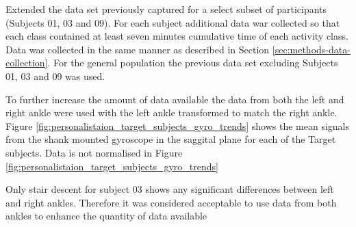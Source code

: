 Extended the data set previously captured for a select subset of participants (Subjects 01, 03 and 09). For each subject additional data war collected so that each class contained at least seven minutes cumulative time of each activity class. Data was collected in the same manner as described in Section \ref{sec:methods-data-collection}. For the general population the previous data set excluding Subjects 01, 03 and 09 was used.

To further increase the amount of data available the data from both the left and right ankle were used with the left ankle transformed to match the right ankle. Figure \ref{fig:personalistaion_target_subjects_gyro_trends} shows the mean signals from the shank mounted gyroscope in the saggital plane for each of the Target subjects. Data is not normalised in Figure \ref{fig:personalistaion_target_subjects_gyro_trends}

Only stair descent for subject 03 shows any significant differences between left and right ankles. Therefore it was considered acceptable to use data from both ankles to enhance the quantity of data available

